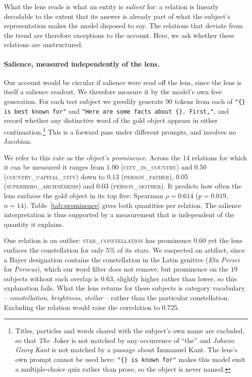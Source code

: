 \documentclass[11pt]{article}
\begin{document}
What the lens reads is what an entity is \emph{salient} for:
a relation is linearly decodable to the extent that its
answer is already part of what the subject's representation makes the
model disposed to say. The relations that deviate from the trend are
therefore exceptions to the account. Here, we ask
whether these relations are unstructured.

\paragraph{Salience, measured independently of the lens.} Our account
would be circular if salience were read off the lens, since the
lens is itself a salience readout. We therefore measure it by the model's
own free generation. For each test subject we greedily generate 90 tokens
from each of \texttt{"\{\} is best known for"} and \texttt{"Here are some
facts about \{\}. First,"}, and record whether any distinctive word of the
gold object appears in either continuation.\footnote{Titles, particles and
words shared with the subject's own name are excluded, so that
\emph{The}~Joker is not matched by any occurrence of ``the'' and
\emph{Johann Georg Kant} is not matched by a passage about Immanuel Kant.
The lens's own prompt cannot be used here: \texttt{"\{\} is known for"}
makes this model emit a multiple-choice quiz rather than prose, so the
object is never named.} This is a forward pass under different prompts,
and involves no Jacobian.



We refer to this rate as the object's \emph{prominence}. Across the 14 relations
for which it can be measured it ranges from $1.00$
(\textsc{city\_in\_country}) and $0.50$ (\textsc{country\_capital\_city})
down to $0.13$ (\textsc{person\_father}), $0.05$
(\textsc{superhero\_archnemesis}) and $0.03$
(\textsc{person\_mother}). It predicts how often the lens surfaces the
gold object in its top five: Spearman $\rho = 0.614$ ($p = 0.019$,
$n = 14$). Table~\ref{tab:prominence} gives both quantities per relation.
The salience interpretation is thus supported by a measurement that is
independent of the quantity it explains.

One relation is an outlier: \textsc{star\_constellation} has prominence $0.60$
yet the lens surfaces the constellation for only $5\%$ of its stars. We
suspected an artifact, since a Bayer designation contains the
constellation in the Latin genitive (\emph{Eta Persei} for
\emph{Perseus}), which our word filter does not remove; but prominence on
the $19$ subjects without such overlap is $0.63$, slightly higher rather
than lower, so this explanation fails. What the lens returns for these
subjects is category vocabulary -- \emph{constellation}, \emph{brightness},
\emph{stellar} -- rather than the particular constellation. Excluding the relation would raise the
correlation to $0.725$.
\end{document}
